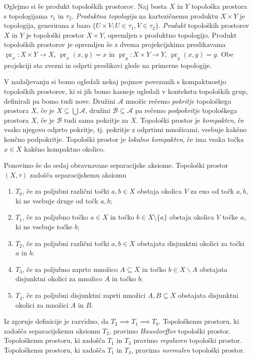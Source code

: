 \documentclass[mat1]{fmfdelo}
\DeclareMathOperator{\pr}{pr}
\begin{document}
Oglejmo si še produkt topoloških prostorov.
Naj bosta $X$ in $Y$ topološka prostora s topologijama $\tau_1$ in $\tau_2$. \emph{Produktna topologija} na kartezičnemu produktu $X \times Y$ je topologija, generirana z bazo $\lbrace U \times V ; U \in \tau_1, V \in \tau_2 \rbrace$. \emph{Produkt} topoloških prostorov $X$ in $Y$ je topološki prostor $X \times Y$, opremljen s produktno topologijo. Produkt topoloških prostorov je opremljen še z dvema projekcijskima preslikavama $\pr_x\colon X \times Y \to X$, $\pr_x(x, y) = x$ in $\pr_y\colon X \times Y \to Y$, $\pr_y(x, y) = y$. Obe projekciji sta zvezni in odprti preslikavi glede na primerne topologije.

V nadaljevanju si bomo ogledali nekaj pojmov povezanih s kompaktnostjo to\-po\-loš\-kih prostorov, ki si jih bomo kasneje ogledali v kontekstu topoloških grup, definirali pa bomo tudi nove.
Družini $\mathcal{A}$ množic rečemo \emph{pokritje} topološkega prostora $X$, če je $X \subseteq \bigcup \mathcal{A}$, družini $\mathcal{B} \subseteq \mathcal{A}$ pa rečemo \emph{podpokritje} topološkega prostora $X$, če je $\mathcal{B}$ tudi sama pokritje za $X$.
Topološki prostor je \emph{kompakten}, če vsako njegovo odprto pokritje, tj. pokritje z odprtimi množicami, vsebuje kakšno končno podpokritje.
Topološki prostor je \emph{lokalno kompakten}, če ima vsaka točka $x \in X$ kakšno kompaktno okolico.

Ponovimo še do sedaj obravnavane separacijske aksiome.
Topološki prostor $(X, \tau)$ zadošča separacijskemu aksiomu
\begin{enumerate}
\item $T_0$, če za poljubni različni točki $a, b \in X$ obstaja okolica $V$ za eno od točk $a, b$, ki ne vsebuje druge od točk $a, b$;
\item $T_1$, če za poljubno točko $a \in X$ in točko $b \in X\setminus\lbrace a \rbrace$ obstaja okolica $V$ točke $a$, ki ne vsebuje točke $b$;
\item $T_2$, če za poljubni različni točki $a, b \in X$ obstajata disjunktni okolici za točki $a$ in $b$;
\item $T_3$, če za poljubno zaprto množico $A \subseteq X$ in točko $b \in X\backslash A$ obstajata disjunktni okolici za množico $A$ in točko $b$;
\item $T_4$, če za poljubni disjunktni zaprti množici $A, B \subseteq X$ obstajata disjunktni okolici za množici $A$ in $B$.
\end{enumerate}

Iz zgornje definicije je razvidno, da $T_2 \implies T_1 \implies T_0$.
Topološkemu prostoru, ki zadošča separacijskemu aksiomu $T_2$, pravimo \emph{Hausdorffov} topološki prostor.
Topološkemu prostoru, ki zadošča $T_1$ in $T_3$ pravimo \emph{regularen} topološki prostor.
Topološkemu prostoru, ki zadošča $T_1$ in $T_4$, pravimo \emph{normalen} topološki prostor.
\end{document}
